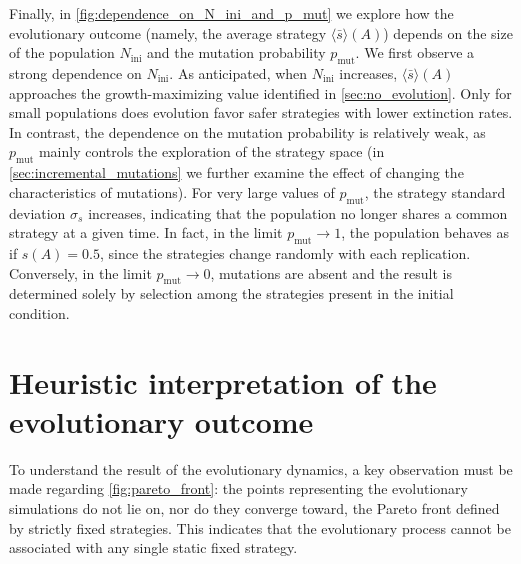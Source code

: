 \documentclass[aps,pre,reprint,10pt,superscriptaddress]{revtex4-2}
\begin{document}
Finally, in \cref{fig:dependence_on_N_ini_and_p_mut} we explore how the evolutionary outcome (namely, the average strategy $\langle\bar{s}\rangle(A)$) depends on the size of the population $N_\text{ini}$ and the mutation probability $p_\text{mut}$. We first observe a strong dependence on $N_\text{ini}$. As anticipated, when $N_\text{ini}$ increases, $\langle\bar{s}\rangle(A)$ approaches the growth-maximizing value identified in \cref{sec:no_evolution}. Only for small populations does evolution favor safer strategies with lower extinction rates. In contrast, the dependence on the mutation probability is relatively weak, as $p_\text{mut}$ mainly controls the exploration of the strategy space (in \cref{sec:incremental_mutations} we further examine the effect of changing the characteristics of mutations). For very large values of $p_\text{mut}$, the strategy standard deviation $\sigma_s$ increases, indicating that the population no longer shares a common strategy at a given time. In fact, in the limit $p_\text{mut} \to 1$, the population behaves as if $s(A) = 0.5$, since the strategies change randomly with each replication. Conversely, in the limit $p_\text{mut} \to 0$, mutations are absent and the result is determined solely by selection among the strategies present in the initial condition.

\section{Heuristic interpretation of the evolutionary outcome} \label{sec:heuristic_interpretation}

To understand the result of the evolutionary dynamics, a key observation must be made regarding \cref{fig:pareto_front}: the points representing the evolutionary simulations do not lie on, nor do they converge toward, the Pareto front defined by strictly fixed strategies. This indicates that the evolutionary process cannot be associated with any single static fixed strategy.
\end{document}
